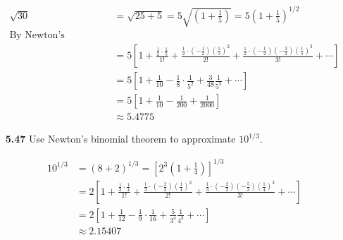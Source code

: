 \documentclass[12pt]{article}
\begin{document}
\begin{enumerate}
    \begin{align*}
        \sqrt{30}&= \sqrt{25+5} = 5\sqrt{\left(1+\frac{1}{5}\right)} = 5\left(1+\frac{1}{5}\right)^{1/2}\\
        \text{By Newton's Binomial Theorem}\\
        &=5\left[1 + \frac{\frac{1}{2}\cdot\frac{1}{5}}{1!} + 
        \frac{\frac{1}{2}\cdot\left(-\frac{1}{2}\right)\left(\frac{1}{5}\right)^2}{2!}+
        \frac{\frac{1}{2}\cdot\left(-\frac{1}{2}\right)\left(-\frac{3}{2}\right)\left(\frac{1}{5}\right)^3}{3!}+\dotsb\right]\\
        &=5\left[1+\frac{1}{10}-\frac{1}{8}\cdot\frac{1}{5^2}+\frac{3}{48}\frac{1}{5^3}+\dotsb        \right]\\
        &=5\left[1+\frac{1}{10}-\frac{1}{200} + \frac{1}{2000}\right]\\
        &\approx 5.4775
    \end{align*}
    
    \vspace{2\baselineskip}
    \item[\bf 5.47] Use Newton's binomial theorem to approximate $10^{1/3}$.
    
    \begin{align*}
        10^{1/3} &= (8+2)^{1/3} = \left[2^3\left(1+\frac{1}{4}\right)\right]^{1/3}\\
        &=2\left[1 + \frac{\frac{1}{3}\cdot\frac{1}{4}}{1!} + 
        \frac{\frac{1}{3}\cdot\left(-\frac{2}{3}\right)\left(\frac{1}{4}\right)^2}{2!}+
        \frac{\frac{1}{3}\cdot\left(-\frac{2}{3}\right)\left(-\frac{5}{3}\right)\left(\frac{1}{4}\right)^3}{3!}+\dotsb\right]\\
        &=2\left[1+\frac{1}{12}-\frac{1}{9}\cdot\frac{1}{16}+\frac{5}{3^4}\frac{1}{4^3}+\dotsb        \right]\\
        &\approx 2.15407
    \end{align*}

\end{enumerate}
\end{document}
